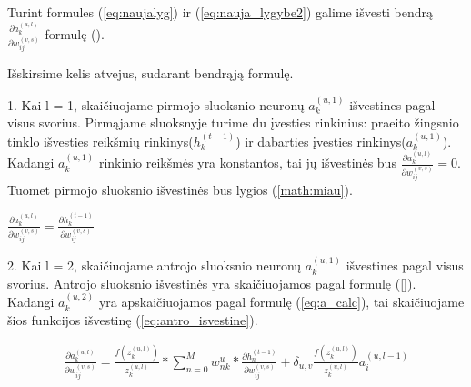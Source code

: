 Turint formules (\ref{eq:naujalyg}) ir (\ref{eq:nauja_lygybe2}) galime išvesti bendrą \begin{math}\frac{\partial a_k^{(u, l)}}{\partial w_{ij}^{(v,s)}}\end{math} formulę ().

Išskirsime kelis atvejus, sudarant bendrąją formulę.

1. Kai l = 1, skaičiuojame pirmojo sluoksnio neuronų \begin{math}a_k^{(u,1)}\end{math} išvestines pagal visus svorius. Pirmąjame sluoksnyje turime du įvesties rinkinius: praeito žingsnio tinklo išvesties reikšmių rinkinys(\begin{math}h_k^{(t-1)}\end{math}) ir dabarties įvesties rinkinys(\begin{math}a_k^{(u,1)}\end{math}). Kadangi \begin{math}a_k^{(u,1)}\end{math} rinkinio reikšmės yra konstantos, tai jų išvestinės bus \begin{math}\frac{\partial a_k^{(u, l)}}{\partial w_{ij}^{(v,s)}} =0\end{math}. Tuomet pirmojo sluoksnio išvestinės bus lygios (\ref{math:miau}).

\begin{math}\label{math:miau}
  \frac{\partial a_k^{(u, l)}}{\partial w_{ij}^{(v,s)}} = \frac{\partial h_k^{(t-1)}}{\partial w_{ij}^{(v,s)}}
\end{math}

2. Kai l = 2, skaičiuojame antrojo sluoksnio neuronų \begin{math}a_k^{(u,1)}\end{math} išvestines pagal visus svorius. Antrojo sluoksnio išvestinės yra skaičiuojamos pagal formulę (\ref{}).
Kadangi \begin{math}a_k^{(u,2)}\end{math} yra apskaičiuojamos pagal formulę (\ref{eq:a_calc}), tai skaičiuojame šios funkcijos išvestinę (\ref{eq:antro_isvestine}).

\begin{equation}\label{eq:antro_isvestine}
  \begin{aligned}
    \frac{\partial a_k^{(u, l)}}{\partial w_{ij}^{(v,s)}} = \frac{f(z_k^{(u,l)})}{z_k^{(u,l)}}
    *
    \sum_{n=0}^M w_{nk}^u * \frac{\partial h_n^{(t-1)}}{\partial w_{ij}^{(v,s)}} +
    \delta_{u,v}\frac{f(z_k^{(u,l)})}{z_k^{(u,l)}}a_i^{(u,l-1)}
  \end{aligned}
\end{equation}

